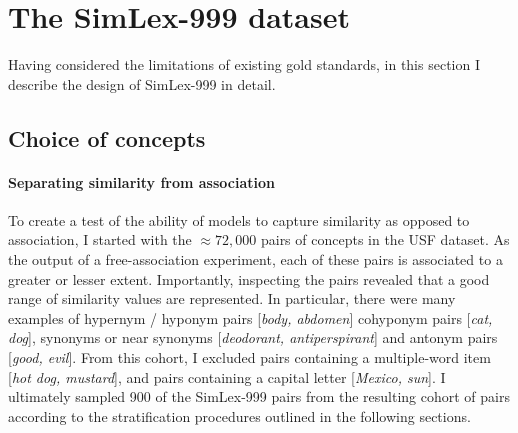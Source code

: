 
\section{The SimLex-999 dataset} 
\label{simlex}

Having considered the limitations of existing gold standards, in this section I describe the design of SimLex-999 in detail. 

\subsection{Choice of concepts}

\paragraph{Separating similarity from association}To create a test of the ability of models to capture similarity as opposed to association, I started with the \(\approx 72,000\) pairs of concepts in the USF dataset. As the output of a free-association experiment, each of these pairs is associated to a greater or lesser extent. Importantly, inspecting the pairs revealed that a good range of similarity values are represented. In particular, there were many examples of hypernym / hyponym pairs [\emph{body, abdomen}] cohyponym pairs [\emph{cat, dog}], synonyms or near synonyms [\emph{deodorant, antiperspirant}] and antonym pairs [\emph{good, evil}]. From this cohort, I excluded pairs containing a multiple-word item [\emph{hot dog, mustard}], and pairs containing a capital letter [\emph{Mexico, sun}]. I ultimately sampled 900 of the SimLex-999 pairs from the resulting cohort of pairs according to the stratification procedures outlined in the following sections. 


